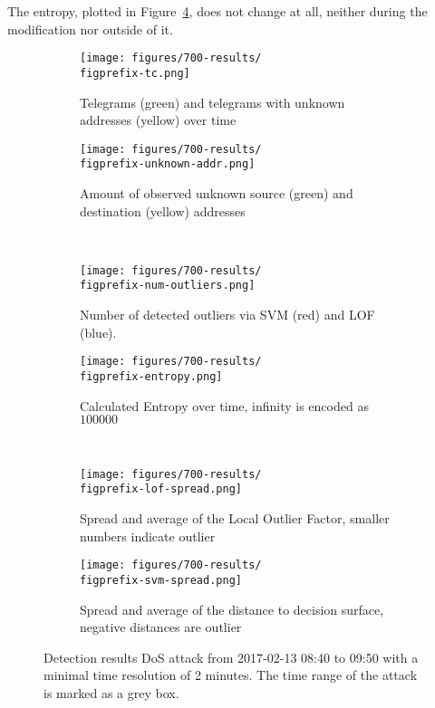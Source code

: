 The entropy, plotted in Figure~\ref{fig:results:dos:entropy}, does not change at all, neither during the modification nor outside of it.

\begin{figure}[H]
	\newcommand{\figwith}{0.49\textwidth}
	\newcommand{\figprefix}{dos}
	\centering
	
	\begin{subfigure}[b]{\figwith}
		\texttt{[image: figures/700-results/\\figprefix-tc.png]}
		\caption{Telegrams (green) and telegrams with unknown addresses (yellow) over time}
		\label{fig:results:\figprefix:tc}
	\end{subfigure}
	\hfil
	\begin{subfigure}[b]{\figwith}
		\texttt{[image: figures/700-results/\\figprefix-unknown-addr.png]}
		\caption{Amount of observed unknown source (green) and destination (yellow) addresses}
		\label{fig:results:\figprefix:addr}
	\end{subfigure}
	\\[1.5mm]
	\begin{subfigure}[b]{\figwith}
		\texttt{[image: figures/700-results/\\figprefix-num-outliers.png]}
		\caption{Number of detected outliers via SVM (red) and LOF (blue).}
		\label{fig:results:\figprefix:outlier}
	\end{subfigure}
	\hfil
	\begin{subfigure}[b]{\figwith}
		\texttt{[image: figures/700-results/\\figprefix-entropy.png]}
		\caption{Calculated Entropy over time, infinity is encoded as $100 000$}
		\label{fig:results:\figprefix:entropy}
	\end{subfigure}
	\\[1.5mm]
	\begin{subfigure}[b]{\figwith}
		\texttt{[image: figures/700-results/\\figprefix-lof-spread.png]}
		\caption{Spread and average of the Local Outlier Factor, smaller numbers indicate outlier}
		\label{fig:results:\figprefix:lof}
	\end{subfigure}
	\hfil
	\begin{subfigure}[b]{\figwith}
		\texttt{[image: figures/700-results/\\figprefix-svm-spread.png]}
		\caption{Spread and average of the distance to decision surface, negative distances are outlier}
		\label{fig:results:\figprefix:svm}
	\end{subfigure}
	
	\caption[Detection results of the DoS attack]{Detection results DoS attack from 2017-02-13 08:40 to 09:50 with a minimal time resolution of 2 minutes. The time range of the attack is marked as a grey box.}
	\label{fig:results:\figprefix}
	
\end{figure}

